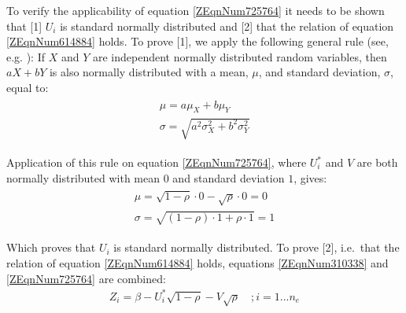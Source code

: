 {%


To verify the applicability of equation \eqref{ZEqnNum725764} it needs to be shown that [1] $U_i$ is standard normally distributed and [2] that the relation of equation \eqref{ZEqnNum614884} holds.
To prove [1], we apply the following general rule (see, e.g. \cite{GrimmettStirzaker1983}): If $X$ and $Y$ are independent normally distributed random variables, then $aX+bY$ is also normally distributed with a mean, $\mu$, and standard deviation, $\sigma$, equal to:
\begin{align}
\begin{array}{l} {\mu =a\mu _{X} +b\mu _{Y} } \\ {\sigma =\sqrt{a^{2} \sigma _{X}^{2} +b^{2} \sigma _{Y}^{2} } } \end{array} 
\end{align}

Application of this rule on equation \eqref{ZEqnNum725764}, where $U_i^{*}$ and $V$ are both normally distributed with mean $0$ and standard deviation $1$, gives:
\begin{align}
\begin{array}{l} {\mu =\sqrt{1-\rho } \cdot 0-\sqrt{\rho } \cdot 0=0} \\ {\sigma =\sqrt{\left(1-\rho \right)\cdot 1+\rho \cdot 1} =1} \end{array} 
\end{align}

Which proves that $U_i$ is standard normally distributed.
To prove [2], i.e.\ that the relation of equation \eqref{ZEqnNum614884} holds, equations \eqref{ZEqnNum310338} and \eqref{ZEqnNum725764} are combined: 
\begin{align}
Z_{i} =\beta -U_{i}^{*} \sqrt{1-\rho } -V\sqrt{\rho } \quad ;i=1...n_{e} \label{ZEqnNum883030} 
\end{align}

}

